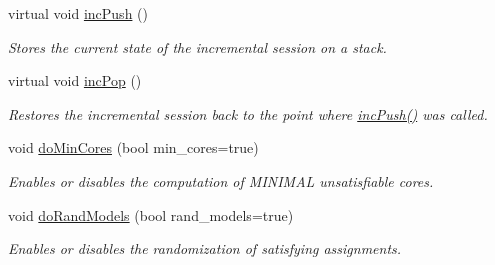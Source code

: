 \begin{DoxyCompactItemize}
virtual void \hyperlink{classMiniSatApi_a27013ace25320f68252bef5ba9f2e9ad}{inc\-Push} ()
\begin{DoxyCompactList}\small\item\em Stores the current state of the incremental session on a stack. \end{DoxyCompactList}\item 
virtual void \hyperlink{classMiniSatApi_af388f97db15f77baeb420a8fef74ca6a}{inc\-Pop} ()
\begin{DoxyCompactList}\small\item\em Restores the incremental session back to the point where \hyperlink{classMiniSatApi_a27013ace25320f68252bef5ba9f2e9ad}{inc\-Push()} was called. \end{DoxyCompactList}\item 
void \hyperlink{classSatSolver_a159fc9658709e5aeba2844a09454b2cb}{do\-Min\-Cores} (bool min\-\_\-cores=true)
\begin{DoxyCompactList}\small\item\em Enables or disables the computation of M\-I\-N\-I\-M\-A\-L unsatisfiable cores. \end{DoxyCompactList}\item 
void \hyperlink{classSatSolver_ae229c5e277350710412fce0e867dc566}{do\-Rand\-Models} (bool rand\-\_\-models=true)
\begin{DoxyCompactList}\small\item\em Enables or disables the randomization of satisfying assignments. \end{DoxyCompactList}\end{DoxyCompactItemize}
